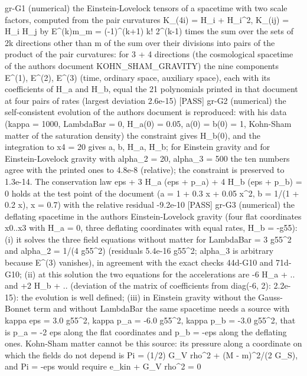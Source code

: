 \documentclass[
  10pt,
]{article}
\newenvironment{Shaded}{}{}
\newcommand{\NormalTok}[1]{#1}
\begin{document}
\begin{Shaded}
\begin{Highlighting}[]
\NormalTok{[PASS] gr{-}G1  (numerical) the Einstein{-}Lovelock tensors of a spacetime with two scale factors, computed from the pair curvatures K\_(4i) = H\_i\textquotesingle{} + H\_i\^{}2, K\_(ij) = H\_i H\_j by E\^{}(k)m\_m = ({-}1)\^{}(k+1) k! 2\^{}(k{-}1) times the sum over the sets of 2k directions other than m of the sum over their divisions into pairs of the product of the pair curvatures: for 3 + 4 directions (the cosmological spacetime of the author\textquotesingle{}s document KOHN\_SHAM\_GRAVITY) the nine components E\^{}(1), E\^{}(2), E\^{}(3) (time, ordinary space, auxiliary space), each with its coefficients of H\_a\textquotesingle{} and H\_b\textquotesingle{}, equal the 21 polynomials printed in that document at four pairs of rates (largest deviation 2.6e{-}15)}
\NormalTok{[PASS] gr{-}G2  (numerical) the self{-}consistent evolution of the author\textquotesingle{}s document is reproduced: with his data (kappa = 1000, LambdaBar = 0, H\_a(0) = 0.05, a(0) = b(0) = 1, Kohn{-}Sham matter of the saturation density) the constraint gives H\_b(0), and the integration to x4 = 20 gives a, b, H\_a, H\_b; for Einstein gravity and for Einstein{-}Lovelock gravity with alpha\_2 = 20, alpha\_3 = 500 the ten numbers agree with the printed ones to 4.8e{-}8 (relative); the constraint is preserved to 1.3e{-}14. The conservation law eps\textquotesingle{} + 3 H\_a (eps + p\_a) + 4 H\_b (eps + p\_b) = 0 holds at the test point of the document (a = 1 + 0.3 x + 0.05 x\^{}2, b = 1/(1 + 0.2 x), x = 0.7) with the relative residual {-}9.2e{-}10}
\NormalTok{[PASS] gr{-}G3  (numerical) the deflating spacetime in the author\textquotesingle{}s Einstein{-}Lovelock gravity (four flat coordinates x0..x3 with H\_a = 0, three deflating coordinates with equal rates, H\_b = {-}g55): (i) it solves the three field equations without matter for LambdaBar = 3 g55\^{}2 and alpha\_2 = 1/(4 g55\^{}2) (residuals 5.4e{-}16 g55\^{}2; alpha\_3 is arbitrary because E\^{}(3) vanishes), in agreement with the exact checks 44d{-}G10 and 71d{-}G10; (ii) at this solution the two equations for the accelerations are {-}6 H\_a\textquotesingle{} + .. and +2 H\_b\textquotesingle{} + .. (deviation of the matrix of coefficients from diag({-}6, 2): 2.2e{-}15): the evolution is well defined; (iii) in Einstein gravity without the Gauss{-}Bonnet term and without LambdaBar the same spacetime needs a source with kappa eps = 3.0 g55\^{}2, kappa p\_a = {-}6.0 g55\^{}2, kappa p\_b = {-}3.0 g55\^{}2, that is p\_a = {-}2 eps along the flat coordinates and p\_b = {-}eps along the deflating ones. Kohn{-}Sham matter cannot be this source: its pressure along a coordinate on which the fields do not depend is Pi = (1/2) G\_V rho\^{}2 + (M {-} m)\^{}2/(2 G\_S), and Pi = {-}eps would require e\_kin + G\_V rho\^{}2 = 0}

\end{Highlighting}
\end{Shaded}
\end{document}
